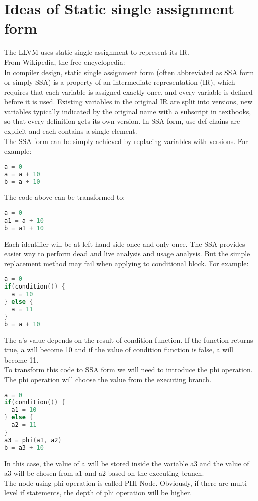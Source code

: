 \section{Ideas of Static single assignment form}
The LLVM uses static single assignment to represent its IR. \\
From Wikipedia, the free encyclopedia: \\
In compiler design, static single assignment form (often abbreviated as SSA form or simply SSA) is a property of an intermediate representation (IR), which requires that each variable is assigned exactly once, and every variable is defined before it is used. Existing variables in the original IR are split into versions, new variables typically indicated by the original name with a subscript in textbooks, so that every definition gets its own version. In SSA form, use-def chains are explicit and each contains a single element. \\
The SSA form can be simply achieved by replacing variables with versions. For example:
\begin{lstlisting}[language=c]
a = 0
a = a + 10
b = a + 10
\end{lstlisting}
The code above can be transformed to:
\begin{lstlisting}[language=c]
a = 0
a1 = a + 10
b = a1 + 10
\end{lstlisting}
Each identifier will be at left hand side once and only once. The SSA provides easier way to perform dead and live analysis and usage analysis. But the simple replacement method may fail when applying to conditional block. For example:
\begin{lstlisting}[language=c]
a = 0
if(condition()) {
  a = 10
} else {
  a = 11
}
b = a + 10
\end{lstlisting}
The a’s value depends on the result of condition function. If the function returns true, a will become 10 and if the value of condition function is false, a will become 11. \\
To transform this code to SSA form we will need to introduce the phi operation. The phi operation will choose the value from the executing branch.
\begin{lstlisting}[language=c]
a = 0
if(condition()) {
  a1 = 10
} else {
  a2 = 11
}
a3 = phi(a1, a2)
b = a3 + 10
\end{lstlisting}
In this case, the value of a will be stored inside the variable a3 and the value of a3 will be chosen from a1 and a2 based on the executing branch. \\
The node using phi operation is called PHI Node. Obviously, if there are multi-level if statements, the depth of phi operation will be higher.



